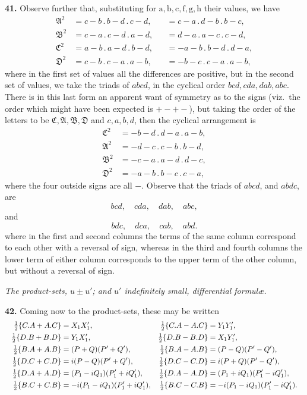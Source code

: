 \documentclass[11pt]{article}
\newcommand{\Ag}{\mathfrak{A}}
\newcommand{\Bg}{\mathfrak{B}}
\newcommand{\Cg}{\mathfrak{C}}
\newcommand{\Dg}{\mathfrak{D}}
\begin{document}
\medskip
\textbf{41.} Observe further that, substituting for $\mathrm{a},\mathrm{b},\mathrm{c},\mathrm{f},\mathrm{g},\mathrm{h}$ their values, we have
\[
\begin{aligned}
\Ag^2 &= c-b\,.\,b-d\,.\,c-d, &&= c-a\,.\,d-b\,.\,b-c,\\
\Bg^2 &= c-a\,.\,c-d\,.\,a-d, &&= d-a\,.\,a-c\,.\,c-d,\\
\Cg^2 &= a-b\,.\,a-d\,.\,b-d, &&= -a-b\,.\,b-d\,.\,d-a,\\
\Dg^2 &= c-b\,.\,c-a\,.\,a-b, &&= -b-c\,.\,c-a\,.\,a-b,
\end{aligned}
\]
where in the first set of values all the differences are positive, but in the second set of values, we take the triads of $abcd$, in the cyclical order $bcd, cda, dab, abc$. There is in this last form an apparent want of symmetry as to the signs (viz.\ the order which might have been expected is $+-+-$), but taking the order of the letters to be $\Cg,\Ag,\Bg,\Dg$ and $c,a,b,d$, then the cyclical arrangement is
\[
\begin{aligned}
\Cg^2 &= -b-d\,.\,d-a\,.\,a-b,\\
\Ag^2 &= -d-c\,.\,c-b\,.\,b-d,\\
\Bg^2 &= -c-a\,.\,a-d\,.\,d-c,\\
\Dg^2 &= -a-b\,.\,b-c\,.\,c-a,
\end{aligned}
\]
where the four outside signs are all $-$. Observe that the triads of $abcd$, and $abdc$, are
\[
bcd,\quad cda,\quad dab,\quad abc,
\]
and
\[
bdc,\quad dca,\quad cab,\quad abd.
\]
where in the first and second columns the terms of the same column correspond to each other with a reversal of sign, whereas in the third and fourth columns the lower term of either column corresponds to the upper term of the other column, but without a reversal of sign.

\medskip
\begin{center}\textit{The product-sets, $u\pm u'$; and $u'$ indefinitely small, differential formul\ae.}\end{center}

\textbf{42.} Coming now to the product-sets, these may be written
\[
\resizebox{\textwidth}{!}{$\displaystyle
\begin{aligned}
\tfrac{1}{2}\{C.A+A.C\} &= X_1 X_1', & \tfrac{1}{2}\{C.A-A.C\} &= Y_1 Y_1',\\
\tfrac{1}{2}\{D.B+B.D\} &= Y_1 X_1', & \tfrac{1}{2}\{D.B-B.D\} &= X_1 Y_1',\\
\tfrac{1}{2}\{B.A+A.B\} &= (P+Q)(P'+Q'), & \tfrac{1}{2}\{B.A-A.B\} &= (P-Q)(P'-Q'),\\
\tfrac{1}{2}\{D.C+C.D\} &= i(P-Q)(P'+Q'), & \tfrac{1}{2}\{D.C-C.D\} &= i(P+Q)(P'-Q'),\\
\tfrac{1}{2}\{D.A+A.D\} &= (P_1-iQ_1)(P_1'+iQ_1'), & \tfrac{1}{2}\{D.A-A.D\} &= (P_1+iQ_1)(P_1'-iQ_1'),\\
\tfrac{1}{2}\{B.C+C.B\} &= -i(P_1-iQ_1)(P_1'+iQ_1'), & \tfrac{1}{2}\{B.C-C.B\} &= -i(P_1-iQ_1)(P_1'-iQ_1').
\end{aligned}$}
\]
\end{document}
